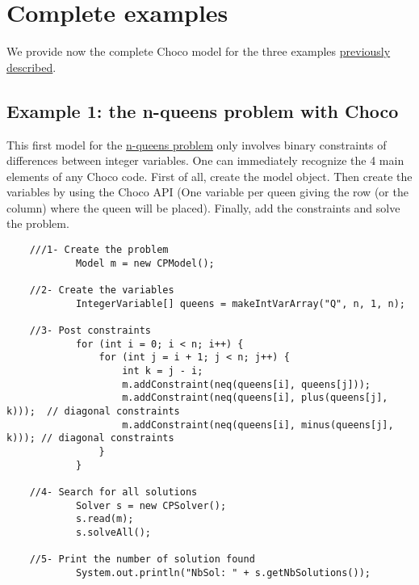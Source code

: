 \section{Complete examples}\label{model:completeexamples}\hypertarget{model:completeexamples}{}
We provide now the complete Choco model for the three examples \hyperlink{introduction:examples}{previously described}.

\subsection{Example 1: the n-queens problem with Choco}\label{model:example1:nqueenschoco}\hypertarget{model:example1:nqueenschoco}{}
This first model for the \hyperlink{introduction:example1:nqueens}{n-queens problem} only involves binary constraints of differences between integer variables. One can immediately recognize the 4 main elements of any Choco code. First of all, create the model object. Then create the variables by using the Choco API (One variable per queen giving the row (or the column) where the queen will be placed). Finally, add the constraints and solve the problem. 
\begin{lstlisting}
	///1- Create the problem 
	        Model m = new CPModel();
	
	//2- Create the variables
	        IntegerVariable[] queens = makeIntVarArray("Q", n, 1, n);
	
	//3- Post constraints
	        for (int i = 0; i < n; i++) {
	            for (int j = i + 1; j < n; j++) {
	                int k = j - i;
	                m.addConstraint(neq(queens[i], queens[j]));
	                m.addConstraint(neq(queens[i], plus(queens[j], k)));  // diagonal constraints
	                m.addConstraint(neq(queens[i], minus(queens[j], k))); // diagonal constraints
	            }
	        }
	
	//4- Search for all solutions
	        Solver s = new CPSolver();
	        s.read(m);
	        s.solveAll();
	
	//5- Print the number of solution found
	        System.out.println("NbSol: " + s.getNbSolutions());
\end{lstlisting}

